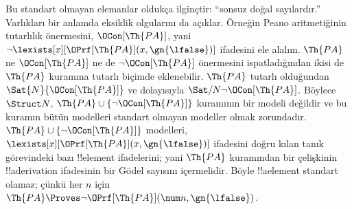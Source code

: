 Bu standart olmayan elemanlar oldukça ilginçtir: ``sonsuz doğal
sayılardır.'' Varlıkları bir anlamda eksiklik olgularını da açıklar.
Örneğin Peano aritmetiğinin tutarlılık önermesini,
$\OCon[\Th{PA}]$, yani
$\lnot\lexists[x][\OPrf[\Th{PA}](x,\gn{\lfalse})]$ ifadesini ele
alalım. $\Th{PA}$ ne $\OCon[\Th{PA}]$ ne de
$\lnot\OCon[\Th{PA}]$ önermesini ispatladığından ikisi de $\Th{PA}$
kuramına tutarlı biçimde eklenebilir. $\Th{PA}$ tutarlı olduğundan
$\Sat{N}{\OCon[\Th{PA}]}$ ve dolayısıyla
$\Sat/{N}{\lnot\OCon[\Th{PA}]}$. Böylece $\Struct N$,
$\Th{PA}\cup\{\lnot\OCon[\Th{PA}]\}$ kuramının bir modeli değildir
ve bu kuramın bütün modelleri standart olmayan modeller olmak
zorundadır. $\Th{PA}\cup\{\lnot\OCon[\Th{PA}]\}$ modelleri,
$\lexists[x][\OPrf[\Th{PA}](x,\gn{\lfalse})]$ ifadesini doğru kılan
tanık görevindeki bazı !!{element} ifadelerini; yani $\Th{PA}$
kuramından bir çelişkinin !!a{derivation} ifadesinin bir Gödel sayısını
içermelidir. Böyle !!a{element} standart olamaz; çünkü her $n$ için
$\Th{PA}\Proves\lnot\OPrf[\Th{PA}](\num n,\gn{\lfalse})$.

